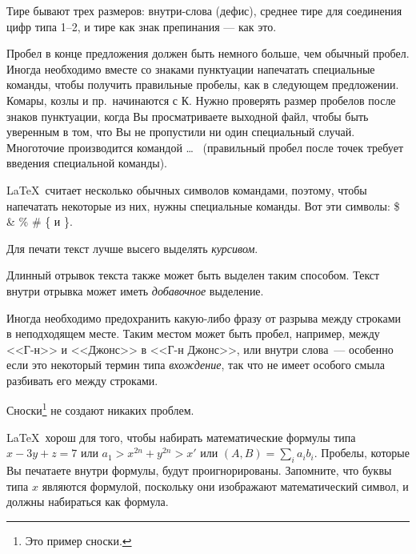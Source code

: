 \documentclass{article}      %
\newcommand{\ip}[2]{(#1, #2)}%
\begin{document}
Тире бывают трех размеров:
        внутри-слова
(дефис), среднее тире для соединения цифр типа
        1--2,
и тире как знак препинания
        --- как
это.

Пробел в конце предложения должен быть немного больше, чем
обычный пробел.  Иногда необходимо вместе со знаками пунктуации
напечатать специальные команды, чтобы получить правильные
пробелы, как в следующем предложении.
        Комары, козлы и        %
        пр.\ начинаются
        с К\@.                 %
Нужно проверять размер пробелов после знаков пунктуации, когда
Вы просматриваете выходной файл, чтобы быть уверенным в том, что Вы
не пропустили ни один специальный случай.
Многоточие производится командой
       \ldots\               %
(правильный пробел после точек требует введения специальной
команды).

\LaTeX\ считает несколько обычных символов командами,
поэтому, чтобы напечатать некоторые из них,     нужны
специальные команды. Вот эти символы:
       \$ \& \% \# \{ и \}.

Для печати текст лучше высего выделять \emph{курсивом}.

\begin{em}
   Длинный отрывок текста также может быть выделен
   таким способом. Текст внутри отрывка может
   иметь \emph{добавочное} выделение.
\end{em}

Иногда необходимо предохранить какую-либо фразу от разрыва
между строками в неподходящем месте. Таким местом может
быть пробел, например, между <<Г-н>> и <<Джонс>> в
        <<Г-н Джонс>>,    %
или внутри слова~--- особенно если это некоторый термин типа
        \mbox{\emph{вхождение}},
так что не имеет особого смыла разбивать его между строками.

Сноски\footnote{Это пример сноски.} не создают никаких проблем.

\LaTeX\ хорош для того, чтобы набирать математические формулы
типа
       \( x-3y + z = 7 \)
или
       \( a_{1} > x^{2n} + y^{2n} > x' \)
или
       \( \ip{A}{B} = \sum_{i} a_{i} b_{i} \).
Пробелы, которые Вы печатаете внутри формулы, будут
проигнорированы. Запомните, что буквы типа
       $x$                   %
являются формулой, поскольку они изображают математический символ,
и должны набираться как формула.
\end{document}
